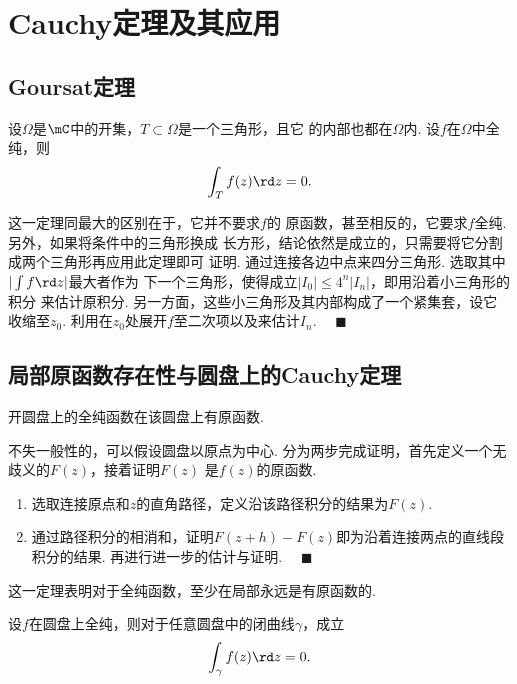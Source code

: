 \section{Cauchy定理及其应用}

\subsection{Goursat定理}

  \begin{thm}[Goursat]
    \label{thm: Goursat}
    设$\Omega$是$\mC$中的开集，$T\subset\Omega$是一个三角形，且它
    的内部也都在$\Omega$内. 设$f$在$\Omega$中全纯，则
    \[
      \int_T f(z)\rd z = 0.
    \]
  \end{thm}
  \remark
    这一定理同最大的区别在于，它并不要求$f$的
    原函数，甚至相反的，它要求$f$全纯. 另外，如果将条件中的三角形换成
    长方形，结论依然是成立的，只需要将它分割成两个三角形再应用此定理即可
    证明.
  \proof
    通过连接各边中点来四分三角形. 选取其中$|\int f\rd z|$最大者作为
    下一个三角形，使得成立$|I_0|\le 4^n|I_n|$，即用沿着小三角形的积分
    来估计原积分. 另一方面，这些小三角形及其内部构成了一个紧集套，设它
    收缩至$z_0$. 利用在$z_0$处展开$f$至二次项以及来估计$I_n$. $\quad\blacksquare$

\subsection{局部原函数存在性与圆盘上的Cauchy定理}

  \begin{thm}[局部存在性]
    \label{thm: 局部存在性}
    开圆盘上的全纯函数在该圆盘上有原函数.
  \end{thm}
  \proof
    不失一般性的，可以假设圆盘以原点为中心.
    分为两步完成证明，首先定义一个无歧义的$F(z)$，接着证明$F(z)$
    是$f(z)$的原函数.
    \begin{enumerate}
      \item 选取连接原点和$z$的直角路径，定义沿该路径积分的结果为$F(z)$.
      \item 通过路径积分的相消和，证明$F(z+h)-
        F(z)$即为沿着连接两点的直线段积分的结果. 再进行进一步的估计与证明.
        $\quad\blacksquare$
    \end{enumerate}
  \remark
    这一定理表明对于全纯函数，至少在局部永远是有原函数的.

  \begin{thm}[圆盘上的Cauchy定理]
    设$f$在圆盘上全纯，则对于任意圆盘中的闭曲线$\gamma$，成立
    \[
      \int_\gamma f(z)\rd z = 0.
    \]
  \end{thm}


